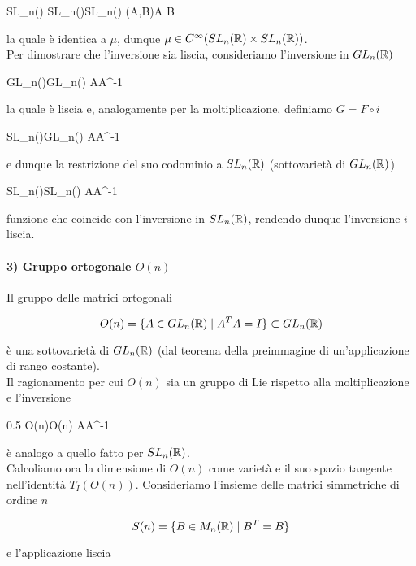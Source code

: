 	{SL_{n}(\R) \times SL_{n}(\R)}{SL_{n}(\R)}
	{(A,B)}{A B}

la quale è identica a $ \mu $, dunque $ \mu \in C^{\infty}(SL_{n}(\mathbb{R}) \times SL_{n}(\mathbb{R})) $.\\
Per dimostrare che l'inversione sia liscia, consideriamo l'inversione in $ GL_{n}(\mathbb{R}) $

	{GL_{n}(\R)}{GL_{n}(\R)}
	{A}{A^{-1}}

la quale è liscia e, analogamente per la moltiplicazione, definiamo $ G = F \circ i $

	{SL_{n}(\R)}{GL_{n}(\R)}
	{A}{A^{-1}}

e dunque la restrizione del suo codominio a $ SL_{n}(\mathbb{R}) $ (sottovarietà di $ GL_{n}(\mathbb{R}) $)

	{SL_{n}(\R)}{SL_{n}(\R)}
	{A}{A^{-1}}

funzione che coincide con l'inversione in $ SL_{n}(\mathbb{R}) $, rendendo dunque l'inversione  $ i $ liscia.

\paragraph{3) Gruppo ortogonale $ O(n) $}

Il gruppo delle matrici ortogonali

\begin{equation}
	O(n) = \{ A \in GL_{n}(\mathbb{R}) \mid A^{T} A = I \} \subset GL_{n}(\mathbb{R})
\end{equation}

è una sottovarietà di $ GL_{n}(\mathbb{R}) $ (dal teorema della preimmagine di un'applicazione di rango costante).\\
Il ragionamento per cui $ O(n) $ sia un gruppo di Lie rispetto alla moltiplicazione e l'inversione

	{0.5}{%
				{O(n)}{O(n)}
				{A}{A^{-1}}
			}

è analogo a quello fatto per $ SL_{n}(\mathbb{R}) $.\\
Calcoliamo ora la dimensione di $ O(n) $ come varietà e il suo spazio tangente nell'identità $ T_{I}(O(n)) $. Consideriamo l'insieme delle matrici simmetriche di ordine $ n $

\begin{equation}
	S(n) = \{ B \in M_{n}(\mathbb{R}) \mid B^{T} = B \}
\end{equation}

e l'applicazione liscia

